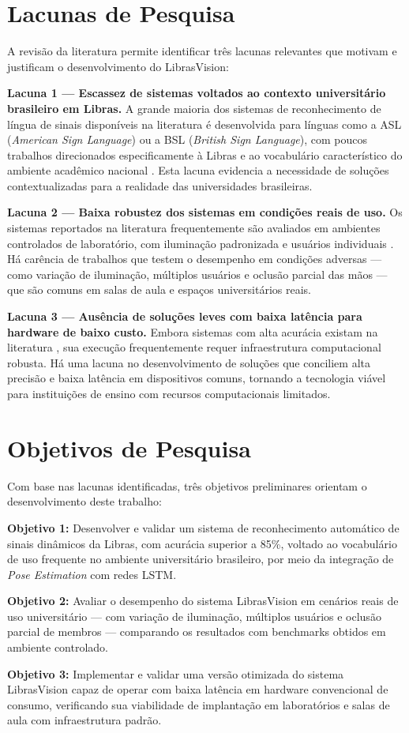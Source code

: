 \section{Lacunas de Pesquisa}

A revisão da literatura permite identificar três lacunas relevantes que motivam e justificam o desenvolvimento do LibrasVision:

\textbf{Lacuna 1 — Escassez de sistemas voltados ao contexto universitário brasileiro em Libras.} A grande maioria dos sistemas de reconhecimento de língua de sinais disponíveis na literatura é desenvolvida para línguas como a ASL (\textit{American Sign Language}) ou a BSL (\textit{British Sign Language}), com poucos trabalhos direcionados especificamente à Libras e ao vocabulário característico do ambiente acadêmico nacional \cite{dockens:18}. Esta lacuna evidencia a necessidade de soluções contextualizadas para a realidade das universidades brasileiras.

\textbf{Lacuna 2 — Baixa robustez dos sistemas em condições reais de uso.} Os sistemas reportados na literatura frequentemente são avaliados em ambientes controlados de laboratório, com iluminação padronizada e usuários individuais \cite{attili:24, jain:24}. Há carência de trabalhos que testem o desempenho em condições adversas — como variação de iluminação, múltiplos usuários e oclusão parcial das mãos — que são comuns em salas de aula e espaços universitários reais.

\textbf{Lacuna 3 — Ausência de soluções leves com baixa latência para hardware de baixo custo.} Embora sistemas com alta acurácia existam na literatura \cite{abdulhussein:20, li:22}, sua execução frequentemente requer infraestrutura computacional robusta. Há uma lacuna no desenvolvimento de soluções que conciliem alta precisão e baixa latência em dispositivos comuns, tornando a tecnologia viável para instituições de ensino com recursos computacionais limitados.

\section{Objetivos de Pesquisa}

Com base nas lacunas identificadas, três objetivos preliminares orientam o desenvolvimento deste trabalho:

\textbf{Objetivo 1:} Desenvolver e validar um sistema de reconhecimento automático de sinais dinâmicos da Libras, com acurácia superior a 85\%, voltado ao vocabulário de uso frequente no ambiente universitário brasileiro, por meio da integração de \textit{Pose Estimation} com redes LSTM.

\textbf{Objetivo 2:} Avaliar o desempenho do sistema LibrasVision em cenários reais de uso universitário — com variação de iluminação, múltiplos usuários e oclusão parcial de membros — comparando os resultados com benchmarks obtidos em ambiente controlado.

\textbf{Objetivo 3:} Implementar e validar uma versão otimizada do sistema LibrasVision capaz de operar com baixa latência em hardware convencional de consumo, verificando sua viabilidade de implantação em laboratórios e salas de aula com infraestrutura padrão.